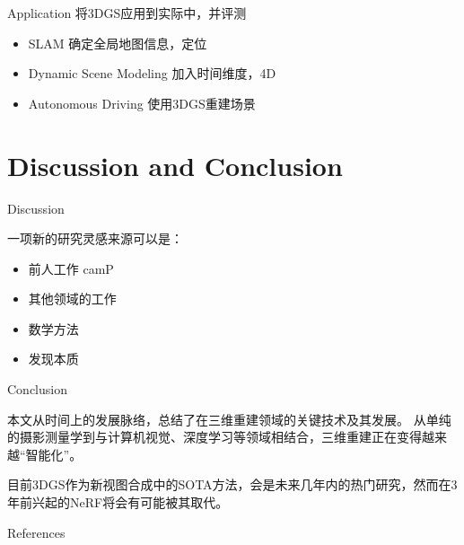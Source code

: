 \documentclass[dark]{sintefbeamer}
\begin{document}
\begin{frame}[fragile]{Application}
  将3DGS应用到实际中，并评测

  \begin{itemize}
    \item SLAM \quad 确定全局地图信息，定位
    \item Dynamic Scene Modeling \quad 加入时间维度，4D
    \item Autonomous Driving \quad 使用3DGS重建场景
  \end{itemize}

  
\end{frame}

\section{Discussion and Conclusion}

\begin{frame}[fragile]{Discussion}

  一项新的研究灵感来源可以是：
  \begin{itemize}
    \item 前人工作 camP\cite{parkCamPCameraPreconditioning2023}
    \item 其他领域的工作
    \item 数学方法
    \item 发现本质
  \end{itemize}

\end{frame}

\begin{frame}[fragile]{Conclusion}

  本文从时间上的发展脉络，总结了在三维重建领域的关键技术及其发展。
  从单纯的摄影测量学到与计算机视觉、深度学习等领域相结合，三维重建正在变得越来越“智能化”。

  目前3DGS作为新视图合成中的SOTA方法，会是未来几年内的热门研究，然而在3年前兴起的NeRF将会有可能被其取代。

\end{frame}

\backmatter

\begin{frame}[t, allowframebreaks]{References}{\,}
\framesubtitle{\quad}
\tiny
  
  
\end{frame}
\end{document}
